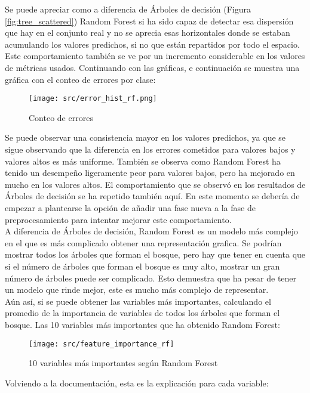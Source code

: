 Se puede apreciar como a diferencia de Árboles de decisión (Figura \ref{fig:tree_scattered}) Random Forest si ha sido capaz de detectar esa dispersión que hay en el conjunto real y no se aprecia esas horizontales donde se estaban acumulando los valores predichos, si no que están repartidos por todo el espacio. Este comportamiento también se ve por un incremento considerable en los valores de métricas usados.
\clearpage
Continuando con las gráficas, e continuación se muestra una gráfica con el conteo de errores por clase:
\begin{figure}[H]
	\centering
	\texttt{[image: src/error\_hist\_rf.png]}
	\caption{Conteo de errores}
	\label{fig:rf_error_plot}
\end{figure}
Se puede observar una consistencia mayor en los valores predichos, ya que se sigue observando que la diferencia en los errores cometidos para valores bajos y valores altos es más uniforme. También se observa como Random Forest ha tenido un desempeño ligeramente peor para valores bajos, pero ha mejorado en mucho en los valores altos. El comportamiento que se observó en los resultados de Árboles de decisión se ha repetido también aquí. En este momento se debería de empezar a plantearse la opción de añadir una fase nueva a la fase de preprocesamiento para intentar mejorar este comportamiento.\\
\linebreak
A diferencia de Árboles de decisión, Random Forest es un modelo más complejo en el que es más complicado obtener una representación grafica. Se podrían mostrar todos los árboles que forman el bosque, pero hay que tener en cuenta que si el número de árboles que forman el bosque es muy alto, mostrar un gran número de árboles puede ser complicado. Esto demuestra que ha pesar de tener un modelo que rinde mejor, este es mucho más complejo de representar. \\
Aún así, si se puede obtener las variables más importantes, calculando el promedio de la importancia de variables de todos los árboles que forman el bosque.
\clearpage
Las 10 variables más importantes que ha obtenido Random Forest:
\begin{figure}[H]
	\centering
	\texttt{[image: src/feature\_importance\_rf]}
	\caption{10 variables más importantes según Random Forest}
	\label{fig:feature_rf}
\end{figure}
Volviendo a la documentación, esta es la explicación para cada variable:
